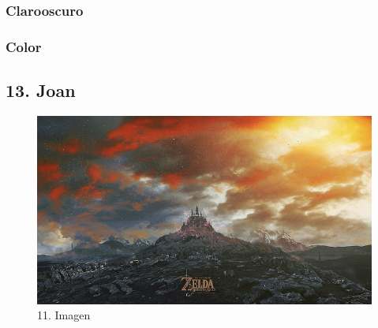 \documentclass[12pt]{article}
\begin{document}
        \subsubsection{Clarooscuro}

        \subsubsection{Color}
        \newpage


    \subsection{13. Joan}
        \begin{figure}[H]
          \centering
          \includegraphics[scale=0.20]{images/Concepts/13_concept_art.jpg}
          \caption{\small 11. Imagen}
        \end{figure}
\end{document}
